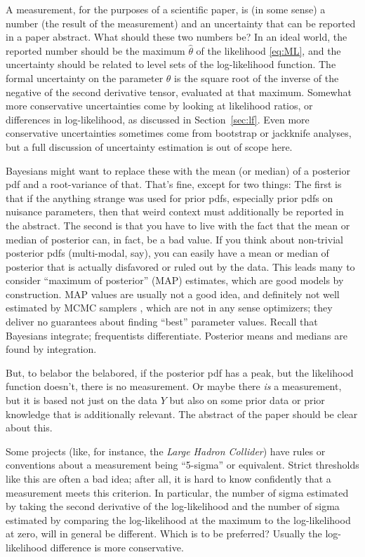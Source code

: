 \documentclass{article}
\newcommand{\sectionname}{Section}
\newcommand{\secref}[1]{\sectionname~\ref{#1}}
\begin{document}
A measurement, for the purposes of a scientific paper, is (in some sense) a number (the result of the measurement) and an uncertainty that can be reported in a paper abstract.
What should these two numbers be?
In an ideal world, the reported number should be the maximum $\hat\theta$ of the likelihood \eqref{eq:ML}, and the uncertainty should be related to level sets of the log-likelihood function.
The formal uncertainty on the parameter $\theta$ is the square root of the inverse of the negative of the second derivative tensor, evaluated at that maximum.
Somewhat more conservative uncertainties come by looking at likelihood ratios, or differences in log-likelihood, as discussed in \secref{sec:lf}.
Even more conservative uncertainties sometimes come from bootstrap \cite{bootstrap} or jackknife \cite{jackknife} analyses, but a full discussion of uncertainty estimation is out of scope here.

Bayesians might want to replace these with the mean (or median) of a posterior pdf and a root-variance of that.
That's fine, except for two things:
The first is that if the anything strange was used for prior pdfs, especially prior pdfs on nuisance parameters, then that weird context must additionally be reported in the abstract.
The second is that you have to live with the fact that the mean or median of posterior can, in fact, be a bad value.
If you think about non-trivial posterior pdfs (multi-modal, say), you can easily have a mean or median of posterior that is actually disfavored or ruled out by the data.
This leads many to consider ``maximum of posterior'' (MAP) estimates, which are good models by construction.
MAP values are usually not a good idea, and definitely not well estimated by MCMC samplers \cite{mcmc}, which are not in any sense optimizers; they deliver no guarantees about finding ``best'' parameter values.
Recall that Bayesians integrate; frequentists differentiate.
Posterior means and medians are found by integration.

But, to belabor the belabored, if the posterior pdf has a peak, but the likelihood function doesn't, there is no measurement.
Or maybe there \emph{is} a measurement, but it is based not just on the data $Y$ but also on some prior data or prior knowledge that is additionally relevant.
The abstract of the paper should be clear about this.

Some projects (like, for instance, the \textsl{Large Hadron Collider}) have rules or conventions about a measurement being ``5-sigma'' or equivalent.
Strict thresholds like this are often a bad idea; after all, it is hard to know confidently that a measurement meets this criterion.
In particular, the number of sigma estimated by taking the second derivative of the log-likelihood and the number of sigma estimated by comparing the log-likelihood at the maximum to the log-likelihood at zero, will in general be different.
Which is to be preferred?
Usually the log-likelihood difference is more conservative.
\end{document}
